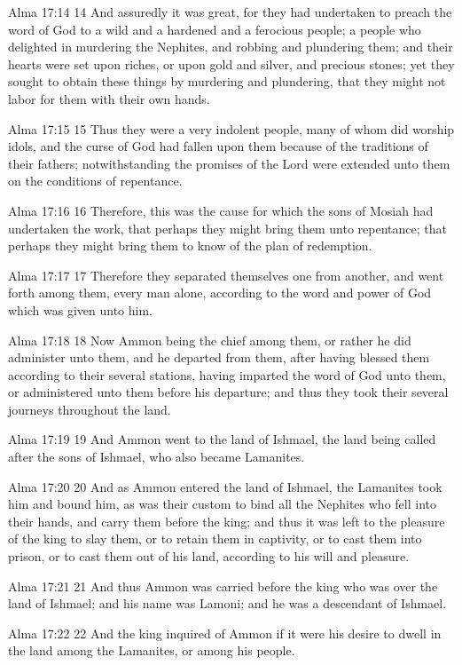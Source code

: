 Alma 17:14
 14 And assuredly it was great, for they had undertaken to preach
the word of God to a wild and a hardened and a ferocious people;
a people who delighted in murdering the Nephites, and robbing and
plundering them; and their hearts were set upon riches, or upon
gold and silver, and precious stones; yet they sought to obtain
these things by murdering and plundering, that they might not
labor for them with their own hands.

Alma 17:15
 15 Thus they were a very indolent people, many of whom did
worship idols, and the curse of God had fallen upon them because
of the traditions of their fathers; notwithstanding the promises
of the Lord were extended unto them on the conditions of
repentance.

Alma 17:16
 16 Therefore, this was the cause for which the sons of Mosiah
had undertaken the work, that perhaps they might bring them unto
repentance; that perhaps they might bring them to know of the
plan of redemption.

Alma 17:17
 17 Therefore they separated themselves one from another, and
went forth among them, every man alone, according to the word and
power of God which was given unto him.

Alma 17:18
 18 Now Ammon being the chief among them, or rather he did
administer unto them, and he departed from them, after having
blessed them according to their several stations, having imparted
the word of God unto them, or administered unto them before his
departure; and thus they took their several journeys throughout
the land.

Alma 17:19
 19 And Ammon went to the land of Ishmael, the land being called
after the sons of Ishmael, who also became Lamanites.

Alma 17:20
 20 And as Ammon entered the land of Ishmael, the Lamanites took
him and bound him, as was their custom to bind all the Nephites
who fell into their hands, and carry them before the king; and
thus it was left to the pleasure of the king to slay them, or to
retain them in captivity, or to cast them into prison, or to cast
them out of his land, according to his will and pleasure.

Alma 17:21
 21 And thus Ammon was carried before the king who was over the
land of Ishmael; and his name was Lamoni; and he was a descendant
of Ishmael.

Alma 17:22
 22 And the king inquired of Ammon if it were his desire to dwell
in the land among the Lamanites, or among his people.


